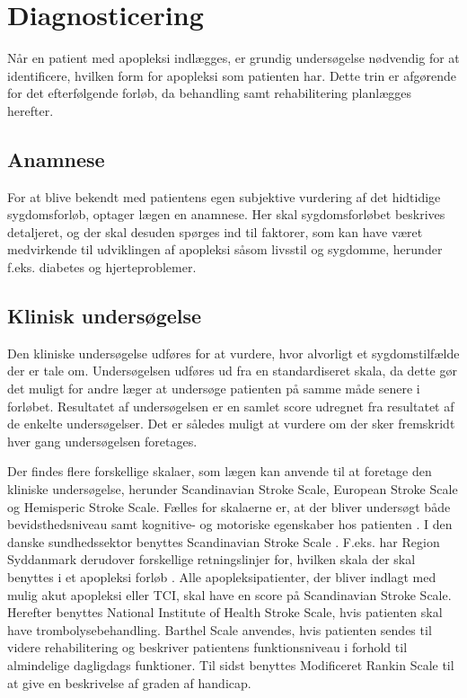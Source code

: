 \section{Diagnosticering}

Når en patient med apopleksi indlægges, er grundig undersøgelse nødvendig for at identificere, hvilken form for apopleksi som patienten har. Dette trin er afgørende for det efterfølgende forløb, da behandling samt rehabilitering planlægges herefter. \cite{Sundhedsstyrelsen2009}

\subsection{Anamnese}
For at blive bekendt med patientens egen subjektive vurdering af det hidtidige sygdomsforløb, optager lægen en anamnese. Her skal sygdomsforløbet  beskrives detaljeret, og der skal desuden spørges ind til faktorer, som kan have været medvirkende til udviklingen af apopleksi såsom livsstil og sygdomme, herunder f.eks. diabetes og hjerteproblemer. \cite{Sundhedsstyrelsen2009}

\subsection{Klinisk undersøgelse}
Den kliniske undersøgelse udføres for at vurdere, hvor alvorligt et sygdomstilfælde der er tale om. Undersøgelsen udføres ud fra en standardiseret skala, da dette gør det muligt for andre læger at undersøge patienten på samme måde senere i forløbet. Resultatet af undersøgelsen er en samlet score udregnet fra resultatet af de enkelte undersøgelser. Det er således muligt at vurdere om der sker fremskridt hver gang undersøgelsen foretages. \cite{Sundhedsstyrelsen2009}

Der findes flere forskellige skalaer, som lægen kan anvende til at foretage den kliniske undersøgelse, herunder Scandinavian Stroke Scale, European Stroke Scale og Hemisperic Stroke Scale. Fælles for skalaerne er, at der bliver undersøgt både bevidsthedsniveau samt kognitive- og motoriske egenskaber hos patienten \cite{Center, Centera, Centerb, Centerc}. I den danske sundhedssektor benyttes Scandinavian Stroke Scale \cite{Apopleksi2009}. F.eks. har Region Syddanmark derudover forskellige retningslinjer for, hvilken skala der skal benyttes i et apopleksi forløb \cite{Syddanmark}. Alle apopleksipatienter, der bliver indlagt med mulig akut apopleksi eller TCI, skal have en score på Scandinavian Stroke Scale. Herefter benyttes National Institute of Health Stroke Scale, hvis patienten skal have trombolysebehandling. Barthel Scale anvendes, hvis patienten sendes til videre rehabilitering og beskriver patientens funktionsniveau i forhold til almindelige dagligdags funktioner. Til sidst benyttes Modificeret Rankin Scale til at give en beskrivelse af graden af handicap. \cite{Syddanmark}

